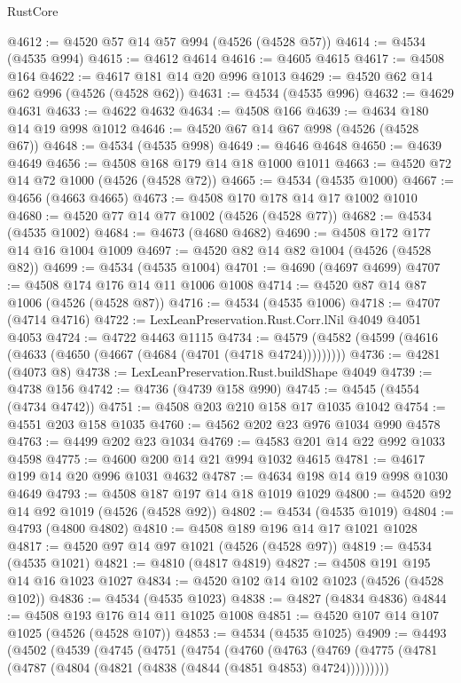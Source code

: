 \begin{lexlean}{RustCore}
\begin{coremodule}
@4612 := @4520 @57 @14 @57 @994 (@4526 (@4528 @57))
@4614 := @4534 (@4535 @994)
@4615 := @4612 @4614
@4616 := @4605 @4615
@4617 := @4508 @164
@4622 := @4617 @181 @14 @20 @996 @1013
@4629 := @4520 @62 @14 @62 @996 (@4526 (@4528 @62))
@4631 := @4534 (@4535 @996)
@4632 := @4629 @4631
@4633 := @4622 @4632
@4634 := @4508 @166
@4639 := @4634 @180 @14 @19 @998 @1012
@4646 := @4520 @67 @14 @67 @998 (@4526 (@4528 @67))
@4648 := @4534 (@4535 @998)
@4649 := @4646 @4648
@4650 := @4639 @4649
@4656 := @4508 @168 @179 @14 @18 @1000 @1011
@4663 := @4520 @72 @14 @72 @1000 (@4526 (@4528 @72))
@4665 := @4534 (@4535 @1000)
@4667 := @4656 (@4663 @4665)
@4673 := @4508 @170 @178 @14 @17 @1002 @1010
@4680 := @4520 @77 @14 @77 @1002 (@4526 (@4528 @77))
@4682 := @4534 (@4535 @1002)
@4684 := @4673 (@4680 @4682)
@4690 := @4508 @172 @177 @14 @16 @1004 @1009
@4697 := @4520 @82 @14 @82 @1004 (@4526 (@4528 @82))
@4699 := @4534 (@4535 @1004)
@4701 := @4690 (@4697 @4699)
@4707 := @4508 @174 @176 @14 @11 @1006 @1008
@4714 := @4520 @87 @14 @87 @1006 (@4526 (@4528 @87))
@4716 := @4534 (@4535 @1006)
@4718 := @4707 (@4714 @4716)
@4722 := LexLeanPreservation.Rust.Corr.lNil @4049 @4051 @4053
@4724 := @4722 @4463 @1115
@4734 := @4579 (@4582 (@4599 (@4616 (@4633 (@4650 (@4667 (@4684 (@4701 (@4718 @4724)))))))))
@4736 := @4281 (@4073 @8)
@4738 := LexLeanPreservation.Rust.buildShape @4049
@4739 := @4738 @156
@4742 := @4736 (@4739 @158 @990)
@4745 := @4545 (@4554 (@4734 @4742))
@4751 := @4508 @203 @210 @158 @17 @1035 @1042
@4754 := @4551 @203 @158 @1035
@4760 := @4562 @202 @23 @976 @1034 @990 @4578
@4763 := @4499 @202 @23 @1034
@4769 := @4583 @201 @14 @22 @992 @1033 @4598
@4775 := @4600 @200 @14 @21 @994 @1032 @4615
@4781 := @4617 @199 @14 @20 @996 @1031 @4632
@4787 := @4634 @198 @14 @19 @998 @1030 @4649
@4793 := @4508 @187 @197 @14 @18 @1019 @1029
@4800 := @4520 @92 @14 @92 @1019 (@4526 (@4528 @92))
@4802 := @4534 (@4535 @1019)
@4804 := @4793 (@4800 @4802)
@4810 := @4508 @189 @196 @14 @17 @1021 @1028
@4817 := @4520 @97 @14 @97 @1021 (@4526 (@4528 @97))
@4819 := @4534 (@4535 @1021)
@4821 := @4810 (@4817 @4819)
@4827 := @4508 @191 @195 @14 @16 @1023 @1027
@4834 := @4520 @102 @14 @102 @1023 (@4526 (@4528 @102))
@4836 := @4534 (@4535 @1023)
@4838 := @4827 (@4834 @4836)
@4844 := @4508 @193 @176 @14 @11 @1025 @1008
@4851 := @4520 @107 @14 @107 @1025 (@4526 (@4528 @107))
@4853 := @4534 (@4535 @1025)
@4909 := @4493
    (@4502
      (@4539
        (@4745
          (@4751
            (@4754
              (@4760
                (@4763
                  (@4769
                    (@4775 (@4781 (@4787 (@4804 (@4821 (@4838 (@4844 (@4851 @4853) @4724)))))))))

\end{coremodule}
\end{lexlean}
